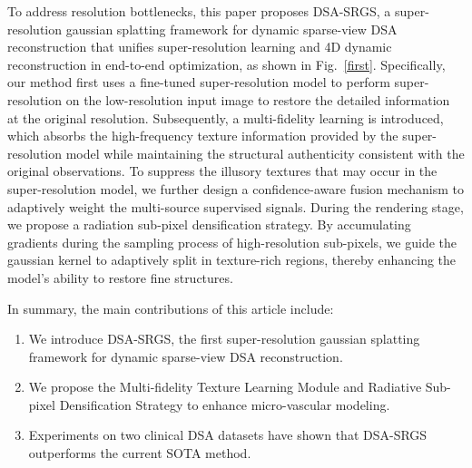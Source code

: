 \documentclass[runningheads]{llncs}
\begin{document}
To address resolution bottlenecks, this paper proposes DSA-SRGS, a super-resolution gaussian splatting framework for dynamic sparse-view DSA reconstruction that unifies super-resolution learning and 4D dynamic reconstruction in end-to-end optimization, as shown in Fig.~\ref{first}.
Specifically, our method first uses a fine-tuned super-resolution model to perform super-resolution on the low-resolution input image to restore the detailed information at the original resolution. Subsequently, a multi-fidelity learning is introduced, which absorbs the high-frequency texture information provided by the super-resolution model while maintaining the structural authenticity consistent with the original observations. To suppress the illusory textures that may occur in the super-resolution model, we further design a confidence-aware fusion mechanism to adaptively weight the multi-source supervised signals. During the rendering stage, we propose a radiation sub-pixel densification strategy. By accumulating gradients during the sampling process of high-resolution sub-pixels, we guide the gaussian kernel to adaptively split in texture-rich regions, thereby enhancing the model's ability to restore fine structures.

In summary, the main contributions of this article include:
\begin{enumerate}
    \item We introduce DSA-SRGS, the first super-resolution gaussian splatting framework for dynamic sparse-view DSA reconstruction.

    \item We propose the Multi-fidelity Texture Learning Module and Radiative Sub-pixel Densification Strategy to enhance micro-vascular modeling.


    \item Experiments on two clinical DSA datasets have shown that DSA-SRGS outperforms the current SOTA method.
\end{enumerate}
\end{document}
